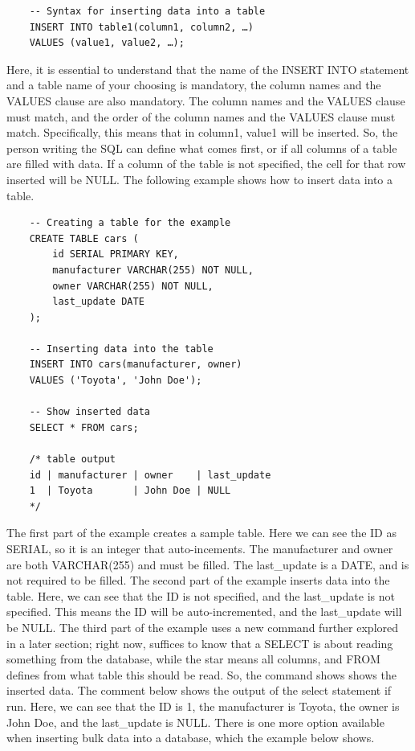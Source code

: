 \begin{verbatim}
    -- Syntax for inserting data into a table
    INSERT INTO table1(column1, column2, …)
    VALUES (value1, value2, …);
\end{verbatim}

Here, it is essential to understand that the name of the INSERT INTO statement and a table name of your choosing is mandatory, the column names and the VALUES clause are also mandatory. The column names and the VALUES clause must match, and the order of the column names and the VALUES clause must match. Specifically, this means that in column1, value1 will be inserted. So, the person writing the SQL can define what comes first, or if all columns of a table are filled with data. If a column of the table is not specified, the cell for that row inserted will be NULL. The following example shows how to insert data into a table.

\begin{verbatim}
    -- Creating a table for the example
    CREATE TABLE cars (
        id SERIAL PRIMARY KEY,
        manufacturer VARCHAR(255) NOT NULL,
        owner VARCHAR(255) NOT NULL,
        last_update DATE
    );

    -- Inserting data into the table
    INSERT INTO cars(manufacturer, owner)
    VALUES ('Toyota', 'John Doe');

    -- Show inserted data
    SELECT * FROM cars;

    /* table output
    id | manufacturer | owner    | last_update
    1  | Toyota       | John Doe | NULL
    */
\end{verbatim}

The first part of the example creates a sample table. Here we can see the ID as SERIAL, so it is an integer that auto-incements. The manufacturer and owner are both VARCHAR(255) and must be filled. The last\_update is a DATE, and is not required to be filled. The second part of the example inserts data into the table. Here, we can see that the ID is not specified, and the last\_update is not specified. This means the ID will be auto-incremented, and the last\_update will be NULL. The third part of the example uses a new command further explored in a later section; right now, suffices to know that a SELECT is about reading something from the database, while the star means all columns, and FROM defines from what table this should be read. So, the command shows shows the inserted data. The comment below shows the output of the select statement if run. Here, we can see that the ID is 1, the manufacturer is Toyota, the owner is John Doe, and the last\_update is NULL. There is one more option available when inserting bulk data into a database, which the example below shows.

